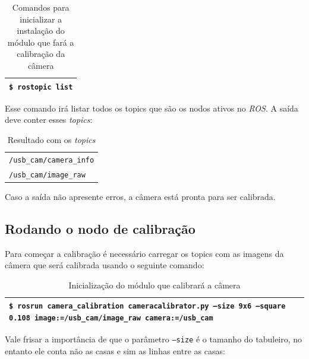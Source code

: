 \begin{table}[!ht]\label{tb:2}
\begin{tabular}{| p{\textwidth}|}
\hline
\texttt{\$ rostopic list}\\
\hline
\end{tabular}
\caption{Comandos para inicializar a instalação do módulo que fará a calibração da câmera}
\end{table}

Esse comando irá listar todos os topics que são os nodos ativos no \textit{ROS}. A saída deve conter esses \textit{topics}:

\begin{table}[!ht]\label{tb:3}
\begin{tabular}{| p{\textwidth}|}
\hline
\texttt{/usb\_cam/camera\_info} \\
\texttt{/usb\_cam/image\_raw}\\
\hline
\end{tabular}
\caption{Resultado com os \textit{topics}}
\end{table}

Caso a saída não apresente erros, a câmera está pronta para ser calibrada.

\subsection{Rodando o nodo de calibração}

Para começar a calibração é necessário carregar os topics com as imagens da câmera que será calibrada usando o seguinte comando:

\begin{table}[!ht]\label{tb:4}
\begin{tabular}{| p{\textwidth}|}
\hline
\texttt{\$ rosrun camera\_calibration cameracalibrator.py --size 9x6 --square 0.108 image:=/usb\_cam/image\_raw camera:=/usb\_cam}\\
\hline
\end{tabular}
\caption{Inicialização do módulo que calibrará a câmera}
\end{table}

Vale frisar a importância de que o parâmetro \texttt{--size} é o tamanho do tabuleiro, no entanto ele conta não as casas e sim as linhas entre as casas:


